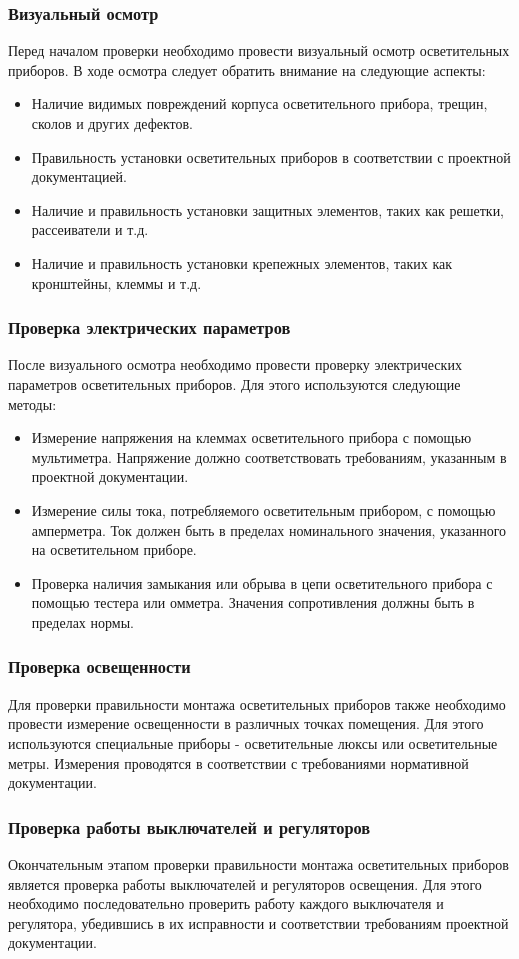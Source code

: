 \documentclass{article}
\begin{document}
\subsubsection{Визуальный осмотр}
Перед началом проверки необходимо провести визуальный осмотр осветительных приборов. В ходе осмотра следует обратить внимание на следующие аспекты:
\begin{itemize}
\item Наличие видимых повреждений корпуса осветительного прибора, трещин, сколов и других дефектов.
\item Правильность установки осветительных приборов в соответствии с проектной документацией.
\item Наличие и правильность установки защитных элементов, таких как решетки, рассеиватели и т.д.
\item Наличие и правильность установки крепежных элементов, таких как кронштейны, клеммы и т.д.
\end{itemize}
\subsubsection{Проверка электрических параметров}
После визуального осмотра необходимо провести проверку электрических параметров осветительных приборов. Для этого используются следующие методы:
\begin{itemize}
\item Измерение напряжения на клеммах осветительного прибора с помощью мультиметра. Напряжение должно соответствовать требованиям, указанным в проектной документации.
\item Измерение силы тока, потребляемого осветительным прибором, с помощью амперметра. Ток должен быть в пределах номинального значения, указанного на осветительном приборе.
\item Проверка наличия замыкания или обрыва в цепи осветительного прибора с помощью тестера или омметра. Значения сопротивления должны быть в пределах нормы.
\end{itemize}
\subsubsection{Проверка освещенности}
Для проверки правильности монтажа осветительных приборов также необходимо провести измерение освещенности в различных точках помещения. Для этого используются специальные приборы - осветительные люксы или осветительные метры. Измерения проводятся в соответствии с требованиями нормативной документации.
\subsubsection{Проверка работы выключателей и регуляторов}
Окончательным этапом проверки правильности монтажа осветительных приборов является проверка работы выключателей и регуляторов освещения. Для этого необходимо последовательно проверить работу каждого выключателя и регулятора, убедившись в их исправности и соответствии требованиям проектной документации.
\end{document}

